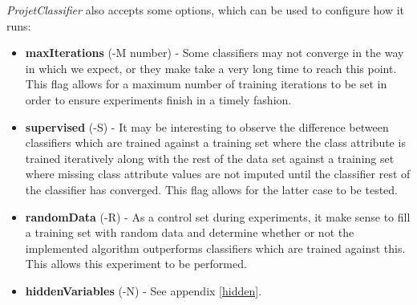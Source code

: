 \textit{ProjetClassifier} also accepts some options, which can be used to configure how it runs:
\begin{itemize}
\item \textbf{maxIterations} (-M number) - Some classifiers may not converge in the way in which we expect, or they make take a very long time to reach this point. This flag allows for a maximum number of training iterations to be set in order to ensure experiments finish in a timely fashion.
\item \textbf{supervised} (-S) - It may be interesting to observe the difference between classifiers which are trained against a training set where the class attribute is trained iteratively along with the rest of the data set against a training set where missing class attribute values are not imputed until the classifier rest of the classifier has converged. This flag allows for the latter case to be tested.
\item \textbf{randomData} (-R) - As a control set during experiments, it make sense to fill a training set with random data and determine whether or not the implemented algorithm outperforms classifiers which are trained against this. This allows this experiment to be performed.
\item \textbf{hiddenVariables} (-N) - See appendix \ref{hidden}.
\end{itemize}

